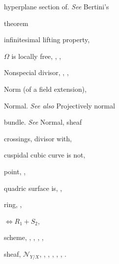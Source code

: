 {{\noindent\hspace*{7.5bp}hyperplane section of. \emph{See} Bertini's\par
\noindent\hspace*{15.0bp}theorem\par
\noindent\hspace*{7.5bp}infinitesimal lifting property, \par
\noindent\hspace*{7.5bp}$\Omega$ is locally free, , , \par
\noindent\hspace*{0.0bp}Nonspecial divisor, , , \par
\noindent\hspace*{0.0bp}Norm (of a field extension), \par
\noindent\hspace*{0.0bp}Normal. \emph{See also} Projectively normal\par
\noindent\hspace*{7.5bp}bundle. \emph{See} Normal, sheaf\par
\noindent\hspace*{7.5bp}crossings, divisor with, \par
\noindent\hspace*{7.5bp}cuspidal cubic curve is not, \par
\noindent\hspace*{7.5bp}point, , \par
\noindent\hspace*{7.5bp}quadric surface is, , \par
\noindent\hspace*{7.5bp}ring, , \par
\noindent\hspace*{7.5bp}$\Leftrightarrow R_1+S_2$, \par
\noindent\hspace*{7.5bp}scheme, , , , , \par
\noindent\hspace*{7.5bp}sheaf, $\mathcal N_{Y/X}$, , , , , , .\par
}}
